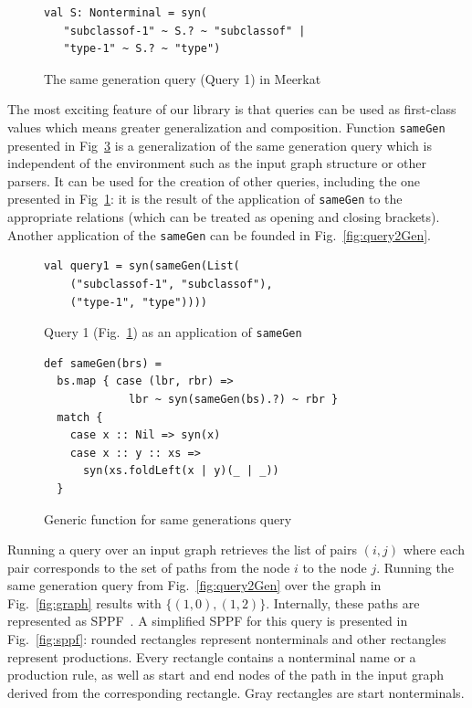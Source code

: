 \begin{figure}[h]
\begin{lstlisting}
val S: Nonterminal = syn(
   "subclassof-1" ~ S.? ~ "subclassof" |
   "type-1" ~ S.? ~ "type")
\end{lstlisting}
\caption{The same generation query (Query 1) in Meerkat}
\label{fig:query1Meerkat}
\end{figure}


The most exciting feature of our library is that queries can be used as first-class values which means greater generalization and composition. 
Function \lstinline{sameGen} presented in Fig~\ref{fig:gen} is a generalization of the same generation query which is independent of the environment such as the input graph structure or other parsers.
It can be used for the creation of other queries, including the one presented in Fig~\ref{fig:query1Meerkat}: it is the result of the application of \lstinline{sameGen} to the appropriate relations (which can be treated as opening and closing brackets).
Another application of the \lstinline{sameGen} can be founded in Fig.~\ref{fig:query2Gen}.

\begin{figure}[h]
\begin{lstlisting}
val query1 = syn(sameGen(List(
    ("subclassof-1", "subclassof"),
    ("type-1", "type"))))
\end{lstlisting}
\caption{Query 1 (Fig.~\ref{fig:query1Meerkat}) as an application of \lstinline{sameGen}}
\label{fig:query1Gen}
\end{figure}

\begin{figure}[h]
\begin{lstlisting}
def sameGen(brs) =
  bs.map { case (lbr, rbr) => 
             lbr ~ syn(sameGen(bs).?) ~ rbr } 
  match {
    case x :: Nil => syn(x)
    case x :: y :: xs => 
      syn(xs.foldLeft(x | y)(_ | _))
  }
\end{lstlisting}
\caption{Generic function for same generations query}
\label{fig:gen}
\end{figure}

Running a query over an input graph retrieves the list of pairs $(i, j)$ where each pair corresponds to the set of paths from the node $i$ to the node $j$. 
Running the same generation query from Fig.~\ref{fig:query2Gen} over the graph in Fig.~\ref{fig:graph} results with $\{(1,0), (1,2)\}$. 
Internally, these paths are represented as SPPF~\cite{SPPF}. 
A simplified SPPF for this query is presented in Fig.~\ref{fig:sppf}: rounded rectangles represent nonterminals and other rectangles represent productions. 
Every rectangle contains a nonterminal name or a production rule, as well as start and end nodes of the path in the input graph derived from the corresponding rectangle. 
Gray rectangles are start nonterminals.

